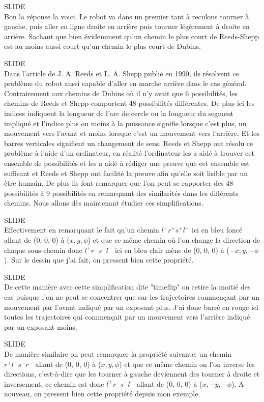 \documentclass[12pt,a4paper]{article}
\newcommand{\slide}{\vspace{0.6cm}SLIDE\\}
\begin{document}
	\slide
	
	Bon la réponse la voici. Le robot va dans un premier tant à reculons tourner à gauche, puis aller en ligne droite en arrière puis tourner légèrement à droite en arrière. Sachant que bien évidemment qu'un chemin le plus court de Reeds-Shepp est au moins aussi court qu'un chemin le plus court de Dubins.
	
	\slide
	
	Dans l'article de J. A. Reeds et L. A. Shepp publié en 1990, ils résolvent ce problème du robot aussi capable d'aller en marche arrière dans le cas général. Contrairement aux chemins de Dubins où il n'y avait que 6 possibilités, les chemins de Reeds et Shepp comportent 48 possibilités différentes. De plus ici les indices indiquent la longueur de l'arc de cercle ou la longueur du segment impliqué et l'indice plus ou moins à la puissance signifie lorsque c'est plus, un mouvement vers l'avant et moins lorsque c'est un mouvement vers l'arrière. Et les barres verticales signifient un changement de sens. Reeds et Shepp ont résolu ce problème à l'aide d'un ordinateur, en réalité l'ordinateur les a aidé à trouver cet ensemble de possibilités et les a aidé à rédiger une preuve que cet ensemble est suffisant et Reeds et Shepp ont facilité la preuve afin qu'elle soit lisible par un être humain. De plus ils font remarquer que l'on peut se rapporter des 48 possibilités à 9 possibilités en remarquant des similarités dans les différents chemins. Nous allons dès maintenant étudier ces simplifications.
	
	\slide
	
	Effectivement en remarquant le fait qu'un chemin $l^-r^+s^+l^+$ ici en bleu foncé allant de (0, 0, 0) à ($x, y, \phi$) et que ce même chemin où l'on change la direction de chaque sous-chemin donc $l^+r^-s^-l^-$ ici en bleu clair mène de (0, 0, 0) à ($-x,y,-\phi$). Sur le dessin que j'ai fait, on pressent bien cette propriété.
	
	\slide
	
	De cette manière avec cette simplification dite "timeflip" on retire la moitié des cas puisque l'on ne peut se concentrer que sur les trajectoires commençant par un mouvement par l'avant indiqué par un exposant plus. J'ai donc barré en rouge ici toutes les trajectoires qui commençait par un mouvement vers l'arrière indiqué par un exposant moins.
	
	\slide
	
	De manière similaire on peut remarquer la propriété suivante: un chemin $r^+l^-s^-r^-$ allant de (0, 0, 0) à ($x, y, \phi$) et que ce même chemin on l'on inverse les directions, c'est-à-dire que les tourner à gauche deviennent des tourner à droite et inversement, ce chemin est donc $l^+r^-s^-l^-$ allant de (0, 0, 0) à ($x,-y,-\phi$). A nouveau, on pressent bien cette propriété depuis mon exemple.
	
\end{document}
